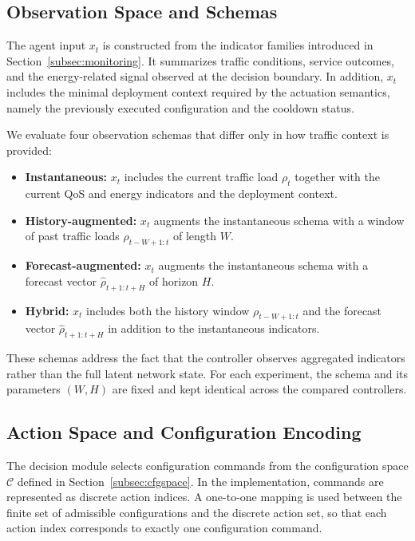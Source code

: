 \documentclass[a4paper,fleqn]{cas-sc}
\begin{document}
\subsection{Observation Space and Schemas}
\label{subsec:obs_space}

The agent input $x_t$ is constructed from the indicator families introduced in Section~\ref{subsec:monitoring}. It summarizes traffic conditions, service outcomes, and the energy-related signal observed at the decision boundary. In addition, $x_t$ includes the minimal deployment context required by the actuation semantics, namely the previously executed configuration and the cooldown status.

We evaluate four observation schemas that differ only in how traffic context is provided:
\begin{itemize}
    \item \textbf{Instantaneous:} $x_t$ includes the current traffic load $\rho_t$ together with the current QoS and energy indicators and the deployment context.
    \item \textbf{History-augmented:} $x_t$ augments the instantaneous schema with a window of past traffic loads $\rho_{t-W+1:t}$ of length $W$.
    \item \textbf{Forecast-augmented:} $x_t$ augments the instantaneous schema with a forecast vector $\hat{\rho}_{t+1:t+H}$ of horizon $H$.
    \item \textbf{Hybrid:} $x_t$ includes both the history window $\rho_{t-W+1:t}$ and the forecast vector $\hat{\rho}_{t+1:t+H}$ in addition to the instantaneous indicators.
\end{itemize}

These schemas address the fact that the controller observes aggregated indicators rather than the full latent network state. For each experiment, the schema and its parameters $(W,H)$ are fixed and kept identical across the compared controllers.

\subsection{Action Space and Configuration Encoding}

\label{subsec:action_space}

The decision module selects configuration commands from the configuration space $\mathcal{C}$ defined in Section~\ref{subsec:cfgspace}. In the implementation, commands are represented as discrete action indices. A one-to-one mapping is used between the finite set of admissible configurations and the discrete action set, so that each action index corresponds to exactly one configuration command.
\end{document}
